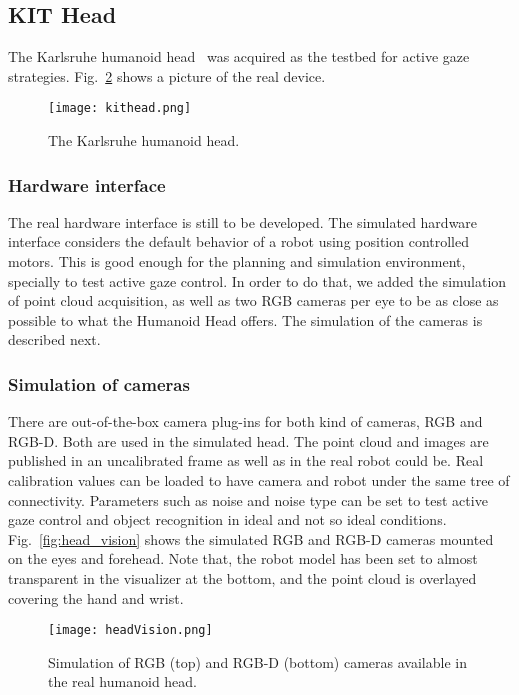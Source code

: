 \subsection{KIT Head}
\label{sec:kithead}

The Karlsruhe humanoid head~\cite{Asfour2008KITHead} was acquired as the testbed for active gaze strategies. Fig.~\ref{fig:kit_head} shows a picture of the real device.

\begin{figure}
\centering
\texttt{[image: kithead.png]}
\caption{The Karlsruhe humanoid head.}
\label{fig:kit_head}
\end{figure}

\subsubsection{Hardware interface}

The real hardware interface is still to be developed. The simulated hardware interface considers the default behavior of a robot using position controlled motors. This is good enough for the planning and simulation environment, specially to test active gaze control. In order to do that, we added the simulation of point cloud acquisition, as well as two RGB cameras per eye to be as close as possible to what the Humanoid Head offers. The simulation of the cameras is described next.

\subsubsection{Simulation of cameras}
There are out-of-the-box camera plug-ins for both kind of cameras, RGB and RGB-D. Both are used in the simulated head. The point cloud and images are published in an uncalibrated frame as well as in the real robot could be. Real calibration values can be loaded to have camera and robot  under the same tree of connectivity. Parameters such as noise and noise type can be set to test active gaze control and object recognition in ideal and not so ideal conditions. Fig.~\ref{fig:head_vision} shows the simulated RGB and RGB-D cameras mounted on the eyes and forehead. Note that, the robot model has been set to almost transparent in the visualizer at the bottom, and the point cloud is overlayed covering the hand and wrist.

\begin{figure}[t]
\centering
\texttt{[image: headVision.png]}
\caption{Simulation of RGB (top) and RGB-D (bottom) cameras available in the real humanoid head.}
\label{fig:kit_head}
\end{figure}